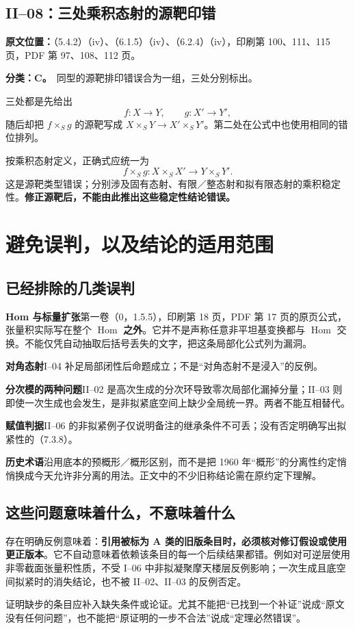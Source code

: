 \documentclass[UTF8,a4paper]{ctexbook}
\DeclareMathOperator{\Hom}{Hom}
\newcommand{\oldauditsrc}[1]{\par\noindent\textbf{原文位置：}#1。\par}
\newcommand{\kind}[2]{\noindent\textbf{分类：#1。}\ #2\par}
\newcommand{\lead}[1]{\par\noindent\textbf{#1}\quad}
\begin{document}
\section{II--08：三处乘积态射的源靶印错}
\oldauditsrc{（5.4.2）（iv）、（6.1.5）（iv）、（6.2.4）（iv），印刷第 100、111、115 页，PDF 第 97、108、112 页}
\kind{C}{同型的源靶排印错误合为一组，三处分别标出。}
三处都是先给出
\[
f:X\longrightarrow Y,\qquad g:X'\longrightarrow Y',
\]
随后却把 $f\times_Sg$ 的源靶写成 $X\times_SY\to X'\times_SY'$。第二处在公式中也使用相同的错位排列。

按乘积态射定义，正确式应统一为
\[
\boxed{f\times_Sg:X\times_SX'\longrightarrow Y\times_SY'.}
\]
这是源靶类型错误；分别涉及固有态射、有限／整态射和拟有限态射的乘积稳定性。\textbf{修正源靶后，不能由此推出这些稳定性结论错误。}

\chapter{避免误判，以及结论的适用范围}
\section{已经排除的几类误判}
\lead{Hom 与标量扩张}第一卷（0，1.5.5），印刷第 18 页，PDF 第 17 页的原页公式，张量积实际写在整个 $\Hom$ \textbf{之外}。它并不是声称任意非平坦基变换都与 $\Hom$ 交换。不能仅凭自动抽取后括号丢失的文字，把这条局部化公式列为漏洞。
\lead{对角态射}I--04 补足局部闭性后命题成立；不是“对角态射不是浸入”的反例。
\lead{分次模的两种问题}II--02 是高次生成的分次环导致零次局部化漏掉分量；II--03 则即使一次生成也会发生，是非拟紧底空间上缺少全局统一界。两者不能互相替代。
\lead{赋值判据}II--06 的非拟紧例子仅说明备注的继承条件不可丢；没有否定明确写出拟紧性的（7.3.8）。
\lead{历史术语}沿用底本的预概形／概形区别，而不是把 1960 年“概形”的分离性约定悄悄换成今天允许非分离的用法。正文中的不少旧称结论需在原约定下理解。

\section{这些问题意味着什么，不意味着什么}
存在明确反例意味着：\textbf{引用被标为 A 类的旧版条目时，必须核对修订假设或使用更正版本}。它不自动意味着依赖该条目的每一个后续结果都错。例如对可逆层使用非零截面张量积性质，不受 I--06 中非拟凝聚摩天楼层反例影响；一次生成且底空间拟紧时的消失结论，也不被 II--02、II--03 的反例否定。

证明缺步的条目应补入缺失条件或论证。尤其不能把“已找到一个补证”说成“原文没有任何问题”，也不能把“原证明的一步不合法”说成“定理必然错误”。
\end{document}
